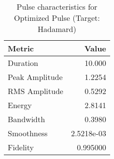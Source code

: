 \begin{table}[h]
\centering
\begin{tabular}{|l|r|}
\hline
\textbf{Metric} & \textbf{Value} \\
\hline
Duration & 10.000 \\
Peak Amplitude & 1.2254 \\
RMS Amplitude & 0.5292 \\
Energy & 2.8141 \\
Bandwidth & 0.3980 \\
Smoothness & 2.5218e-03 \\
Fidelity & 0.995000 \\
\hline
\end{tabular}
\caption{Pulse characteristics for Optimized Pulse (Target: Hadamard)}
\label{tab:pulse_optimized_pulse}
\end{table}